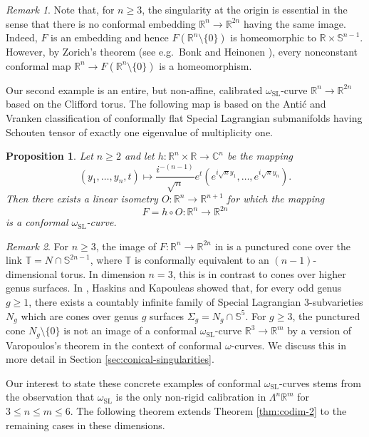 \documentclass[a4paper,leqno,11pt]{amsart}
\numberwithin{equation}{section}
\newtheorem{proposition}[theorem]{Proposition}
\theoremstyle{remark}
\newtheorem*{remark*}{Remark}
\theoremstyle{remark}
\newcommand{\R}{\mathbb{R}}
\newcommand{\C}{\mathbb{C}}
\newcommand{\bS}{\mathbb{S}}
\newcommand{\SL}{\mathrm{SL}}
\begin{document}
\begin{remark*}
Note that, for $n\ge 3$, the singularity at the origin is essential in the sense that there is no conformal embedding $\R^n \to \R^{2n}$ having the same image. Indeed, $F$ is an embedding and hence $F(\R^n\setminus \{0\})$ is homeomorphic to $\R\times \bS^{n-1}$. However, by Zorich's theorem (see e.g.~Bonk and Heinonen \cite[Proposition 1.4]{Bo:Hei:01}), every nonconstant conformal map $\R^n \to F(\R^n\setminus \{0\})$ is a homeomorphism.
\end{remark*}

Our second example is an entire, but non-affine, calibrated $\omega_\SL$-curve $\R^n \to \R^{2n}$ based on the Clifford torus. The following map is based on the Anti\'c and Vranken classification \cite{Anti:Vra:22} of conformally flat Special Lagrangian submanifolds having Schouten tensor of exactly one eigenvalue of multiplicity one.
\begin{proposition}
\label{prop:SL-example-concrete}
Let $n \geq 2$ and let $h \colon \R^n \times \R \to \C^n$ be the mapping
\[
(y_1,\ldots, y_n,t) \mapsto \frac{i^{-(n-1)}}{\sqrt{n}} e^t \left( e^{i\sqrt{n} y_1}, \ldots, e^{i\sqrt{n} y_n}\right).
\]
Then there exists a linear isometry $O \colon \R^n \to \R^{n+1}$ for which the mapping 
\[
F = h \circ O \colon \R^n \to \R^{2n}
\]
is a conformal $\omega_\SL$-curve. 
\end{proposition}

\begin{remark*}
For $n \geq 3$, the image of $F \colon \R^n \to \R^{2n}$ 
in  is a punctured cone over the link $\mathbb{T} = N \cap \mathbb{S}^{2n-1}$, where $\mathbb{T}$ is conformally equivalent to an $(n-1)$-dimensional torus. In dimension $n=3$, this is in contrast to cones over higher genus surfaces. In \cite{Has:Kap:07}, Haskins and Kapouleas showed that, for every odd genus $g \geq 1$, there exists a countably infinite family of Special Lagrangian $3$-subvarieties $N_g$ which are cones over genus $g$ surfaces $\Sigma_g = N_g \cap \mathbb{S}^{5}$. For $g \ge 3$, the punctured cone $N_g\setminus \{0\}$ is not an image of a conformal $\omega_{\SL}$-curve $\R^3 \to \R^m$ by a version of Varopoulos's theorem \cite[Theorem X.5.1]{Varopoulos:91} in the context of conformal $\omega$-curves. We discuss this in more detail in Section \ref{sec:conical-singularities}.
\end{remark*}



Our interest to state these concrete examples of conformal $\omega_\SL$-curves stems from the observation that $\omega_\SL$ is the only non-rigid calibration in $\Lambda^n \R^m$ for $3 \le n \le m \le 6$. The following theorem extends Theorem \ref{thm:codim-2} to the remaining cases in these dimensions.
\end{document}
